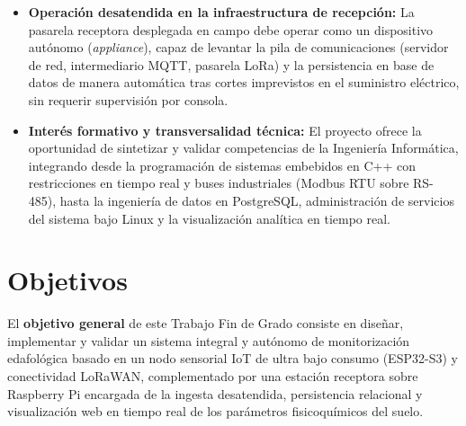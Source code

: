 \begin{itemize}
    \item \textbf{Operación desatendida en la infraestructura de recepción:} La pasarela receptora desplegada en campo debe operar como un dispositivo autónomo (\textit{appliance}), capaz de levantar la pila de comunicaciones (servidor de red, intermediario MQTT, pasarela LoRa) y la persistencia en base de datos de manera automática tras cortes imprevistos en el suministro eléctrico, sin requerir supervisión por consola.

    \item \textbf{Interés formativo y transversalidad técnica:} El proyecto ofrece la oportunidad de sintetizar y validar competencias de la Ingeniería Informática, integrando desde la programación de sistemas embebidos en C++ con restricciones en tiempo real y buses industriales (Modbus RTU sobre RS-485), hasta la ingeniería de datos en PostgreSQL, administración de servicios del sistema bajo Linux y la visualización analítica en tiempo real.
\end{itemize}

\section{Objetivos}
El \textbf{objetivo general} de este Trabajo Fin de Grado consiste en diseñar, implementar y validar un sistema integral y autónomo de monitorización edafológica basado en un nodo sensorial IoT de ultra bajo consumo (ESP32-S3) y conectividad LoRaWAN, complementado por una estación receptora sobre Raspberry Pi encargada de la ingesta desatendida, persistencia relacional y visualización web en tiempo real de los parámetros fisicoquímicos del suelo.

